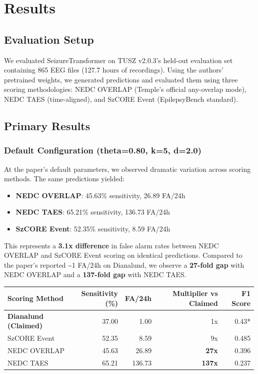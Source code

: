 \hypertarget{results}{%
\section{Results}\label{results}}

\hypertarget{evaluation-setup}{%
\subsection{Evaluation Setup}\label{evaluation-setup}}

We evaluated SeizureTransformer on TUSZ v2.0.3's held-out evaluation set
containing 865 EEG files (127.7 hours of recordings). Using the authors'
pretrained weights, we generated predictions and evaluated them using
three scoring methodologies: NEDC OVERLAP (Temple's official any-overlap
mode), NEDC TAES (time-aligned), and SzCORE Event (EpilepsyBench
standard).

\hypertarget{primary-results}{%
\subsection{Primary Results}\label{primary-results}}

\hypertarget{default-configuration-theta0.80-k5-d2.0}{%
\subsubsection{Default Configuration (theta=0.80, k=5,
d=2.0)}\label{default-configuration-theta0.80-k5-d2.0}}

At the paper's default parameters, we observed dramatic variation across
scoring methods. The same predictions yielded:

\begin{itemize}
\tightlist
\item
  \textbf{NEDC OVERLAP}: 45.63\% sensitivity, 26.89 FA/24h
\item
  \textbf{NEDC TAES}: 65.21\% sensitivity, 136.73 FA/24h
\item
  \textbf{SzCORE Event}: 52.35\% sensitivity, 8.59 FA/24h
\end{itemize}

This represents a \textbf{3.1x difference} in false alarm rates between
NEDC OVERLAP and SzCORE Event scoring on identical predictions. Compared
to the paper's reported \textasciitilde1 FA/24h on Dianalund, we observe
a \textbf{27-fold gap} with NEDC OVERLAP and a \textbf{137-fold gap}
with NEDC TAES.

\begin{longtable}[]{@{}lrrrr@{}}
\toprule
Scoring Method & Sensitivity (\%) & FA/24h & Multiplier vs Claimed & F1
Score\tabularnewline
\midrule
\endhead
\textbf{Dianalund (Claimed)} & 37.00 & 1.00 & 1x & 0.43*\tabularnewline
SzCORE Event & 52.35 & 8.59 & 9x & 0.485\tabularnewline
NEDC OVERLAP & 45.63 & 26.89 & \textbf{27x} & 0.396\tabularnewline
NEDC TAES & 65.21 & 136.73 & \textbf{137x} & 0.237\tabularnewline
\bottomrule
\end{longtable}

